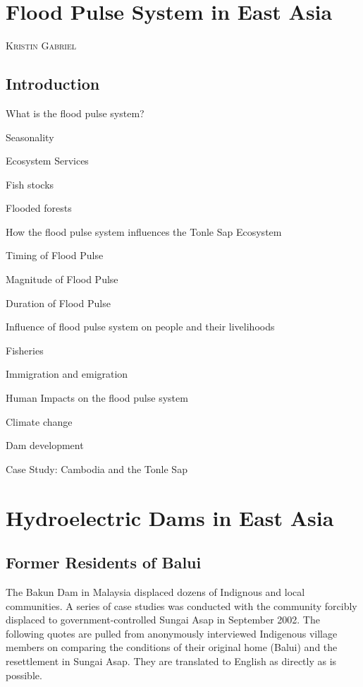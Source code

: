 \documentclass{book}\usepackage{knitr}
\makeatletter
\newcommand{\chapterauthor}[1]{%
  {\parindent0pt\vspace*{-25pt}%
  \linespread{1.1}\large\scshape#1%
  \par\nobreak\vspace*{35pt}}
  \@afterheading%
}
\makeatother
\begin{document}
\chapter{Flood Pulse System in East Asia}

\chapterauthor{Kristin Gabriel}

\section{Introduction}

What is the flood pulse system?

Seasonality

Ecosystem Services

Fish stocks

Flooded forests

How the flood pulse system influences the Tonle Sap Ecosystem

Timing of Flood Pulse

Magnitude of Flood Pulse

Duration of Flood Pulse

Influence of flood pulse system on people and their livelihoods

Fisheries

Immigration and emigration

Human Impacts on the flood pulse system

Climate change

Dam development

Case Study: Cambodia and the Tonle Sap


\chapter{Hydroelectric Dams in East Asia}

\section{Former Residents of Balui}
The Bakun Dam in Malaysia displaced dozens of Indignous and local communities. A series of case studies was conducted with the community forcibly displaced to government-controlled Sungai Asap in September 2002. The following quotes are pulled from anonymously interviewed Indigenous village members on comparing the conditions of their original home (Balui) and the resettlement in Sungai Asap. They are translated to English as directly as is possible. 


\end{document}
